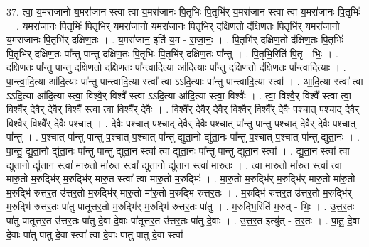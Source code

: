 \documentclass[17pt]{extarticle}
\begin{document}
37. त्वा॒ य॒मरा॑जानो य॒मरा॑जान स्त्वा त्वा य॒मरा॑जानः पि॒तृभिः॑ पि॒तृभि॑र् य॒मरा॑जान स्त्वा त्वा य॒मरा॑जानः पि॒तृभिः॑ । . य॒मरा॑जानः पि॒तृभिः॑ पि॒तृभि॑र् य॒मरा॑जानो य॒मरा॑जानः पि॒तृभि॑र् दक्षिण॒तो द॑क्षिण॒तः पि॒तृभि॑र् य॒मरा॑जानो य॒मरा॑जानः पि॒तृभि॑र् दक्षिण॒तः । . य॒मरा॑जान॒ इति॑ य॒म - रा॒जा॒नः॒ । . पि॒तृभि॑र् दक्षिण॒तो द॑क्षिण॒तः पि॒तृभिः॑ पि॒तृभि॑र् दक्षिण॒तः पा᳚न्तु पान्तु दक्षिण॒तः पि॒तृभिः॑ पि॒तृभि॑र् दक्षिण॒तः पा᳚न्तु । . पि॒तृभि॒रिति॑ पि॒तृ - भिः॒ । . द॒क्षि॒ण॒तः पा᳚न्तु पान्तु दक्षिण॒तो द॑क्षिण॒तः पा᳚न्त्वादि॒त्या आ॑दि॒त्याः पा᳚न्तु दक्षिण॒तो द॑क्षिण॒तः पा᳚न्त्वादि॒त्याः । . पा॒न्त्वा॒दि॒त्या आ॑दि॒त्याः पा᳚न्तु पान्त्वादि॒त्या स्त्वा᳚ त्वा ऽऽदि॒त्याः पा᳚न्तु पान्त्वादि॒त्या स्त्वा᳚ । . आ॒दि॒त्या स्त्वा᳚ त्वा ऽऽदि॒त्या आ॑दि॒त्या स्त्वा॒ विश्वै॒र् विश्वै᳚ स्त्वा ऽऽदि॒त्या आ॑दि॒त्या स्त्वा॒ विश्वैः᳚ । . त्वा॒ विश्वै॒र् विश्वै᳚ स्त्वा त्वा॒ विश्वै᳚र् दे॒वैर् दे॒वैर् विश्वै᳚ स्त्वा त्वा॒ विश्वै᳚र् दे॒वैः । . विश्वै᳚र् दे॒वैर् दे॒वैर् विश्वै॒र् विश्वै᳚र् दे॒वैः प॒श्चात् प॒श्चाद् दे॒वैर् विश्वै॒र् विश्वै᳚र् दे॒वैः प॒श्चात् । . दे॒वैः प॒श्चात् प॒श्चाद् दे॒वैर् दे॒वैः प॒श्चात् पा᳚न्तु पान्तु प॒श्चाद् दे॒वैर् दे॒वैः प॒श्चात् पा᳚न्तु । . प॒श्चात् पा᳚न्तु पान्तु प॒श्चात् प॒श्चात् पा᳚न्तु द्युता॒नो द्यु॑ता॒नः पा᳚न्तु प॒श्चात् प॒श्चात् पा᳚न्तु द्युता॒नः । . पा॒न्तु॒ द्यु॒ता॒नो द्यु॑ता॒नः पा᳚न्तु पान्तु द्युता॒न स्त्वा᳚ त्वा द्युता॒नः पा᳚न्तु पान्तु द्युता॒न स्त्वा᳚ । . द्यु॒ता॒न स्त्वा᳚ त्वा द्युता॒नो द्यु॑ता॒न स्त्वा॑ मारु॒तो मा॑रु॒त स्त्वा᳚ द्युता॒नो द्यु॑ता॒न स्त्वा॑ मारु॒तः । . त्वा॒ मा॒रु॒तो मा॑रु॒त स्त्वा᳚ त्वा मारु॒तो म॒रुद्भि॑र् म॒रुद्भि॑र् मारु॒त स्त्वा᳚ त्वा मारु॒तो म॒रुद्भिः॑ । . मा॒रु॒तो म॒रुद्भि॑र् म॒रुद्भि॑र् मारु॒तो मा॑रु॒तो म॒रुद्भि॑ रुत्तर॒त उ॑त्तर॒तो म॒रुद्भि॑र् मारु॒तो मा॑रु॒तो म॒रुद्भि॑ रुत्तर॒तः । . म॒रुद्भि॑ रुत्तर॒त उ॑त्तर॒तो म॒रुद्भि॑र् म॒रुद्भि॑ रुत्तर॒तः पा॑तु पातूत्तर॒तो म॒रुद्भि॑र् म॒रुद्भि॑ रुत्तर॒तः पा॑तु । . म॒रुद्भि॒रिति॑ म॒रुत् - भिः॒ । . उ॒त्त॒र॒तः पा॑तु पातूत्तर॒त उ॑त्तर॒तः पा॑तु दे॒वा दे॒वाः पा॑तूत्तर॒त उ॑त्तर॒तः पा॑तु दे॒वाः । . उ॒त्त॒र॒त इत्यु॑त् - त॒र॒तः । . पा॒तु॒ दे॒वा दे॒वाः पा॑तु पातु दे॒वा स्त्वा᳚ त्वा दे॒वाः पा॑तु पातु दे॒वा स्त्वा᳚ । \newline
\pagebreak
{}
\end{document}
